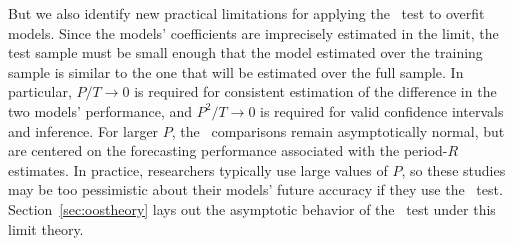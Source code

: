 \documentclass[11pt]{article}
\begin{document}
But we also identify new practical limitations for applying the \dmw\
test to overfit models.
Since the models' coefficients are imprecisely estimated in the limit,
the test sample must be small enough that the model estimated over the
training sample is similar to the one that will be estimated over the
full sample.  In particular, $P/T \to 0$ is required for consistent
estimation of the difference in the two models' performance,
and $P^2/T \to 0$ is required for valid confidence
intervals and inference.  For larger $P$, the \oos\ comparisons remain
asymptotically normal, but are centered on the forecasting performance
associated with the period-$R$ estimates.  In practice, researchers
typically use large values of $P$, so these studies may be too
pessimistic about their models' future accuracy if they use the \dmw\
test.  Section~\ref{sec:oostheory} lays out the asymptotic behavior of
the \dmw\ test under this limit theory.
\end{document}
